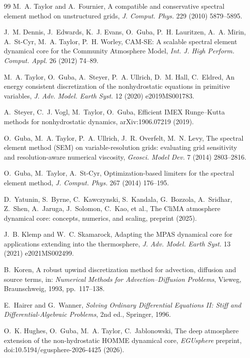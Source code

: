 \documentclass[11pt,a4paper]{article}
\begin{document}
\begin{thebibliography}{99}
M.~A. Taylor and A.~Fournier,
A compatible and conservative spectral element method on unstructured grids,
\emph{J. Comput. Phys.} 229 (2010) 5879--5895.

J.~M. Dennis, J.~Edwards, K.~J. Evans, O.~Guba, P.~H. Lauritzen,
A.~A. Mirin, A.~St-Cyr, M.~A. Taylor, P.~H. Worley,
CAM-SE: A scalable spectral element dynamical core for the Community
Atmosphere Model,
\emph{Int. J. High Perform. Comput. Appl.} 26 (2012) 74--89.

M.~A. Taylor, O.~Guba, A.~Steyer, P.~A. Ullrich, D.~M. Hall, C.~Eldred,
An energy consistent discretization of the nonhydrostatic equations in
primitive variables,
\emph{J. Adv. Model. Earth Syst.} 12 (2020) e2019MS001783.

A.~Steyer, C.~J. Vogl, M.~Taylor, O.~Guba,
Efficient IMEX Runge--Kutta methods for nonhydrostatic dynamics,
arXiv:1906.07219 (2019).

O.~Guba, M.~A. Taylor, P.~A. Ullrich, J.~R. Overfelt, M.~N. Levy,
The spectral element method (SEM) on variable-resolution grids: evaluating
grid sensitivity and resolution-aware numerical viscosity,
\emph{Geosci. Model Dev.} 7 (2014) 2803--2816.

O.~Guba, M.~Taylor, A.~St-Cyr,
Optimization-based limiters for the spectral element method,
\emph{J. Comput. Phys.} 267 (2014) 176--195.

D.~Yatunin, S.~Byrne, C.~Kawczynski, S.~Kandala, G.~Bozzola, A.~Sridhar,
Z.~Shen, A.~Jaruga, J.~Solomon, C.~Kao, et al.,
The CliMA atmosphere dynamical core: concepts, numerics, and scaling,
preprint (2025).

J.~B. Klemp and W.~C. Skamarock,
Adapting the MPAS dynamical core for applications extending into the
thermosphere,
\emph{J. Adv. Model. Earth Syst.} 13 (2021) e2021MS002499.

B.~Koren,
A robust upwind discretization method for advection, diffusion and source
terms,
in: \emph{Numerical Methods for Advection--Diffusion Problems},
Vieweg, Braunschweig, 1993, pp.~117--138.

E.~Hairer and G.~Wanner,
\emph{Solving Ordinary Differential Equations II: Stiff and
Differential-Algebraic Problems}, 2nd ed., Springer, 1996.

O.~K. Hughes, O.~Guba, M.~A. Taylor, C.~Jablonowski,
The deep atmosphere extension of the non-hydrostatic HOMME dynamical core,
\emph{EGUsphere} preprint, doi:10.5194/egusphere-2026-4425 (2026).


\end{thebibliography}
\end{document}
